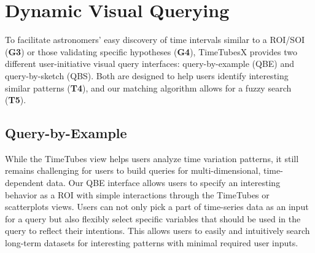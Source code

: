 \section{Dynamic Visual Querying}\label{sec:visualQuery}
To facilitate astronomers' easy discovery of time intervals similar to a ROI/SOI (\textbf{G3}) or those validating specific hypotheses (\textbf{G4}), 
TimeTubesX provides two different user-initiative visual query interfaces: query-by-example (QBE) and query-by-sketch (QBS).
Both are designed to help users identify interesting similar patterns (\textbf{T4}), and our matching algorithm allows for a fuzzy search (\textbf{T5}).

\subsection{Query-by-Example}\label{sec:QBE}
While the TimeTubes view helps users analyze time variation patterns,
it still remains challenging for users to build queries for multi-dimensional, time-dependent data.
Our QBE interface allows users to specify an interesting behavior as a ROI with simple interactions through the TimeTubes or scatterplots views.
Users can not only pick a part of time-series data as an input for a query but also flexibly select specific variables that should be used in the query to reflect their intentions. 
This allows users to easily and intuitively search long-term datasets for interesting patterns with minimal required user inputs.

